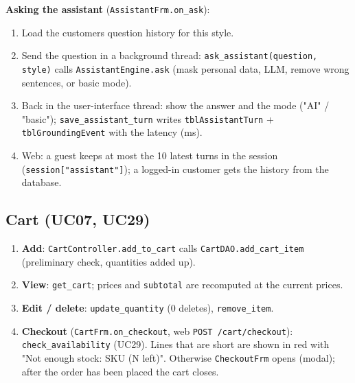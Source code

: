 \textbf{Asking the assistant} (\texttt{AssistantFrm.\allowbreak{}on\_\allowbreak{}ask}):

\begin{enumerate}
\def\labelenumi{\arabic{enumi}.}
\tightlist
\item
  Load the customer\textquotesingle s question history for this style.
\item
  Send the question in a background thread:
  \texttt{ask\_\allowbreak{}assistant(\allowbreak{}question,\allowbreak{} style)} calls
  \texttt{AssistantEngine.\allowbreak{}ask} (mask personal data, LLM, remove wrong
  sentences, or basic mode).
\item
  Back in the user-interface thread: show the answer and the mode ("AI"
  / "basic"); \texttt{save\_\allowbreak{}assistant\_\allowbreak{}turn} writes
  \texttt{tblAssistantTurn} + \texttt{tblGroundingEvent} with the
  latency (ms).
\item
  Web: a guest keeps at most the 10 latest turns in the session
  (\texttt{session{[}"assistant"{]}}); a logged-in customer gets the
  history from the database.
\end{enumerate}

\hypertarget{cart-uc07-uc29}{%
\subsection{Cart (UC07, UC29)}\label{cart-uc07-uc29}}

\begin{enumerate}
\def\labelenumi{\arabic{enumi}.}
\tightlist
\item
  \textbf{Add}: \texttt{CartController.\allowbreak{}add\_\allowbreak{}to\_\allowbreak{}cart} calls
  \texttt{CartDAO.\allowbreak{}add\_\allowbreak{}cart\_\allowbreak{}item} (preliminary check, quantities added
  up).
\item
  \textbf{View}: \texttt{get\_\allowbreak{}cart}; prices and \texttt{subtotal} are
  recomputed at the current prices.
\item
  \textbf{Edit / delete}: \texttt{update\_\allowbreak{}quantity} (0 deletes),
  \texttt{remove\_\allowbreak{}item}.
\item
  \textbf{Checkout} (\texttt{CartFrm.\allowbreak{}on\_\allowbreak{}checkout}, web
  \texttt{POST /\allowbreak{}cart/\allowbreak{}checkout}): \texttt{check\_\allowbreak{}availability} (UC29).
  Lines that are short are shown in red with "Not enough stock: SKU (N
  left)". Otherwise \texttt{CheckoutFrm} opens (modal); after the order
  has been placed the cart closes.
\end{enumerate}

